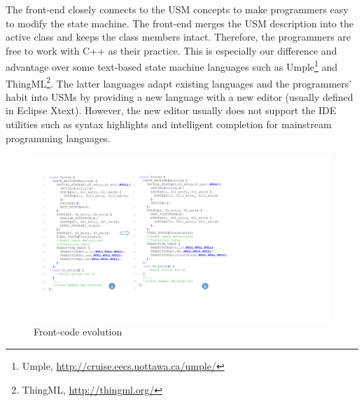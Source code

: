 The front-end closely connects to the USM concepts to make programmers easy to modify the state machine.
The front-end merges the USM description into the active class  and keeps the class members intact. 
Therefore, the programmers are free to work with C++ as their practice.
This is especially our difference and advantage over some text-based state machine languages such as Umple\footnote{Umple, \url{http://cruise.eecs.uottawa.ca/umple/}} and ThingML\footnote{ThingML, \url{http://thingml.org/}}.
The latter languages adapt existing languages and the programmers' habit into USMs by providing a new language with a new editor (usually defined in Eclipse Xtext).
However, the new editor usually does not support the IDE utilities such as syntax highlights and intelligent completion for mainstream programming languages. 



\begin{figure}
	\centering
	\includegraphics[clip, trim=1.10cm 3.6cm 10.9cm 1.9cm, width=1.08\columnwidth]{figures/frontendoverview.pdf}
	\caption{Front-code evolution} 
	\label{fig:frontend-overview}
\end{figure}